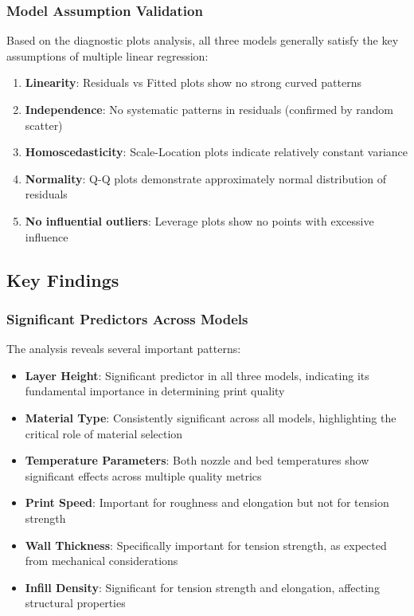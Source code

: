 \subsubsection{Model Assumption Validation}

Based on the diagnostic plots analysis, all three models generally satisfy the key assumptions of multiple linear regression:

\begin{enumerate}
    \item \textbf{Linearity}: Residuals vs Fitted plots show no strong curved patterns
    \item \textbf{Independence}: No systematic patterns in residuals (confirmed by random scatter)
    \item \textbf{Homoscedasticity}: Scale-Location plots indicate relatively constant variance
    \item \textbf{Normality}: Q-Q plots demonstrate approximately normal distribution of residuals
    \item \textbf{No influential outliers}: Leverage plots show no points with excessive influence
\end{enumerate}

\subsection{Key Findings}

\subsubsection{Significant Predictors Across Models}

The analysis reveals several important patterns:

\begin{itemize}
    \item \textbf{Layer Height}: Significant predictor in all three models, indicating its fundamental importance in determining print quality
    \item \textbf{Material Type}: Consistently significant across all models, highlighting the critical role of material selection
    \item \textbf{Temperature Parameters}: Both nozzle and bed temperatures show significant effects across multiple quality metrics
    \item \textbf{Print Speed}: Important for roughness and elongation but not for tension strength
    \item \textbf{Wall Thickness}: Specifically important for tension strength, as expected from mechanical considerations
    \item \textbf{Infill Density}: Significant for tension strength and elongation, affecting structural properties
\end{itemize}

